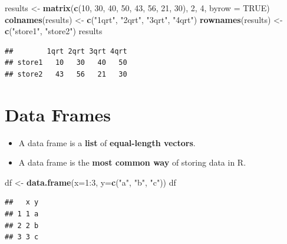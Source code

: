 \documentclass[]{book}
\newenvironment{Shaded}{\begin{snugshade}}{\end{snugshade}}
\newcommand{\KeywordTok}[1]{\textcolor[rgb]{0.13,0.29,0.53}{\textbf{{#1}}}}
\newcommand{\DataTypeTok}[1]{\textcolor[rgb]{0.13,0.29,0.53}{{#1}}}
\newcommand{\DecValTok}[1]{\textcolor[rgb]{0.00,0.00,0.81}{{#1}}}
\newcommand{\StringTok}[1]{\textcolor[rgb]{0.31,0.60,0.02}{{#1}}}
\newcommand{\OtherTok}[1]{\textcolor[rgb]{0.56,0.35,0.01}{{#1}}}
\newcommand{\NormalTok}[1]{{#1}}
\providecommand{\tightlist}{%
  \setlength{\itemsep}{0pt}\setlength{\parskip}{0pt}}
\begin{document}
\begin{Shaded}
\begin{Highlighting}[]
\NormalTok{results <-}\StringTok{ }\KeywordTok{matrix}\NormalTok{(}\KeywordTok{c}\NormalTok{(}\DecValTok{10}\NormalTok{, }\DecValTok{30}\NormalTok{, }\DecValTok{40}\NormalTok{, }\DecValTok{50}\NormalTok{, }\DecValTok{43}\NormalTok{, }\DecValTok{56}\NormalTok{, }\DecValTok{21}\NormalTok{, }\DecValTok{30}\NormalTok{), }\DecValTok{2}\NormalTok{, }\DecValTok{4}\NormalTok{, }\DataTypeTok{byrow =} \OtherTok{TRUE}\NormalTok{)}
\KeywordTok{colnames}\NormalTok{(results) <-}\StringTok{ }\KeywordTok{c}\NormalTok{(}\StringTok{"1qrt"}\NormalTok{, }\StringTok{"2qrt"}\NormalTok{, }\StringTok{"3qrt"}\NormalTok{, }\StringTok{"4qrt"}\NormalTok{)}
\KeywordTok{rownames}\NormalTok{(results) <-}\StringTok{ }\KeywordTok{c}\NormalTok{(}\StringTok{"store1"}\NormalTok{, }\StringTok{"store2"}\NormalTok{)}
\NormalTok{results}
\end{Highlighting}
\end{Shaded}

\begin{verbatim}
##        1qrt 2qrt 3qrt 4qrt
## store1   10   30   40   50
## store2   43   56   21   30
\end{verbatim}

\section{Data Frames}\label{data-frames}

\begin{itemize}
\tightlist
\item
  A data frame is a \textbf{list} of \textbf{equal-length vectors}.
\item
  A data frame is the \textbf{most common way} of storing data in R.
\end{itemize}

\begin{Shaded}
\begin{Highlighting}[]
\NormalTok{df <-}\StringTok{ }\KeywordTok{data.frame}\NormalTok{(}\DataTypeTok{x=}\DecValTok{1}\NormalTok{:}\DecValTok{3}\NormalTok{, }\DataTypeTok{y=}\KeywordTok{c}\NormalTok{(}\StringTok{"a"}\NormalTok{, }\StringTok{"b"}\NormalTok{, }\StringTok{"c"}\NormalTok{))}
\NormalTok{df}
\end{Highlighting}
\end{Shaded}

\begin{verbatim}
##   x y
## 1 1 a
## 2 2 b
## 3 3 c
\end{verbatim}
\end{document}
